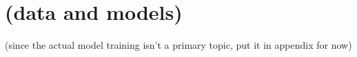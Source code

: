 
\appendix

\section{(data and models)}

(since the actual model training isn't a primary topic, put it in appendix for now)
